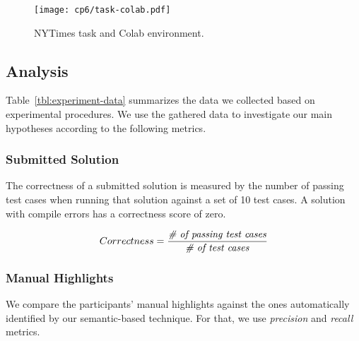 \clearpage

\begin{landscape}
\begin{figure}
    \centering
    \texttt{[image: cp6/task-colab.pdf]}
    \caption{NYTimes task and Colab environment.}
    \label{fig:nytimes-task-colab}
\end{figure}
\end{landscape}

\clearpage


\subsection{Analysis}



Table~\ref{tbl:experiment-data} summarizes the data we collected based on experimental procedures.
We use the gathered data to investigate our main hypotheses according to the following metrics.






\subsubsection{Submitted Solution}

 
The correctness of a submitted solution is measured by the number of passing test cases
when running that solution against a set of 10 test cases. 
A solution with compile errors has a correctness score of zero.


\smallskip
\begin{small}


\begin{equation}
    Correctness = \frac{ \text{\textit{\# of passing test cases}}}{\text{\textit{\#  of test cases}}}
\end{equation}
\end{small}



\subsubsection{Manual Highlights}


We compare the participants' manual highlights  against the ones automatically identified by our semantic-based technique. 
For that, we use \textit{precision} and \textit{recall} metrics. 




